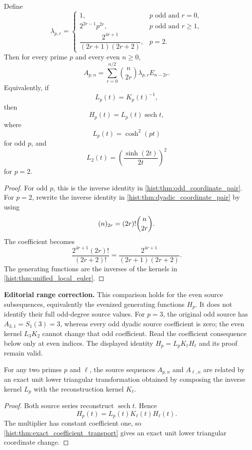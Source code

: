 \begin{histtheorem}\label{hist:thm:unified_inverse_local_euler}
Define
\[
\lambda_{p,r}
=
\begin{cases}
1,&p\text{ odd and }r=0,\\
2^{2r-1}p^{2r},&p\text{ odd and }r\geq1,\\
\dfrac{2^{4r+1}}{(2r+1)(2r+2)},&p=2.
\end{cases}
\]
Then for every prime \(p\) and every even \(n\geq0\),
\[
\boxed{
A_{p,n}
=
\sum_{r=0}^{n/2}
\binom n{2r}
\lambda_{p,r}
E_{n-2r}.
}
\]
Equivalently, if
\[
L_p(t)=K_p(t)^{-1},
\]
then
\[
\boxed{H_p(t)=L_p(t)\operatorname{sech}t,}
\]
where
\[
L_p(t)=\cosh^2(pt)
\]
for odd \(p\), and
\[
L_2(t)=\left(\frac{\sinh(2t)}{2t}\right)^2
\]
for \(p=2\).
\end{histtheorem}

\begin{proof}
For odd \(p\), this is the inverse identity in \cref{hist:thm:odd_coordinate_pair}. For \(p=2\), rewrite the inverse identity in \cref{hist:thm:dyadic_coordinate_pair} by using
\[
(n)_{2r}=(2r)!\binom n{2r}.
\]
The coefficient becomes
\[
\frac{2^{4r+1}(2r)!}{(2r+2)!}
=
\frac{2^{4r+1}}{(2r+1)(2r+2)}.
\]
The generating functions are the inverses of the kernels in \cref{hist:thm:unified_local_euler}.
\end{proof}

\begin{histcorollary}\label{hist:cor:local_source_change}
\par\noindent\textbf{Editorial range correction.} This comparison holds for the even source subsequences, equivalently the evenized generating functions $H_p$. It does not identify their full odd-degree source values. For $p=3$, the original odd source has $A_{3,1}=S_1(3)=3$, whereas every odd dyadic source coefficient is zero; the even kernel $L_3K_2$ cannot change that odd coefficient. Read the coefficient consequence below only at even indices. The displayed identity $H_p=L_pK_\ell H_\ell$ and its proof remain valid.\par\medskip
For any two primes \(p\) and \(\ell\), the source sequences \(A_{p,n}\) and \(A_{\ell,n}\) are related by an exact unit lower triangular transformation obtained by composing the inverse kernel \(L_p\) with the reconstruction kernel \(K_\ell\).
\end{histcorollary}

\begin{proof}
Both source series reconstruct \(\operatorname{sech}t\). Hence
\[
H_p(t)=L_p(t)K_\ell(t)H_\ell(t).
\]
The multiplier has constant coefficient one, so \cref{hist:thm:exact_coefficient_transport} gives an exact unit lower triangular coordinate change.
\end{proof}

